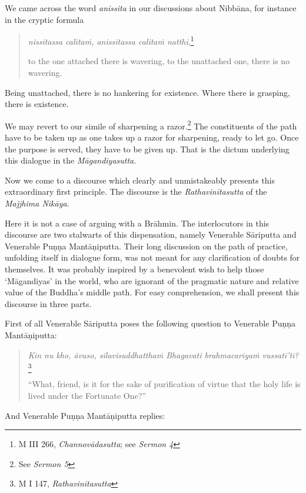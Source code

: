 We came across the word \emph{anissita} in our discussions about Nibbāna, for instance in the cryptic formula

\begin{quote}
\emph{nissitassa calitaṁ, anissitassa calitaṁ natthi},\footnote{M III 266, \emph{Channovādasutta}; see \emph{Sermon 4}}

to the one attached there is wavering, to the unattached one, there is no wavering.
\end{quote}

Being unattached, there is no hankering for existence. Where there is grasping, there is existence.

We may revert to our simile of sharpening a razor.\footnote{See \emph{Sermon 5}} The constituents of the path have to be taken up as one takes up a razor for sharpening, ready to let go. Once the purpose is served, they have to be given up. That is the dictum underlying this dialogue in the \emph{Māgandiyasutta}.

Now we come to a discourse which clearly and unmistakeably presents this extraordinary first principle. The discourse is the \emph{Rathavinītasutta} of the \emph{Majjhima Nikāya}.

Here it is not a case of arguing with a Brāhmin. The interlocutors in this discourse are two stalwarts of this dispensation, namely Venerable Sāriputta and Venerable Puṇṇa Mantāṇiputta. Their long discussion on the path of practice, unfolding itself in dialogue form, was not meant for any clarification of doubts for themselves. It was probably inspired by a benevolent wish to help those `Māgandiyas' in the world, who are ignorant of the pragmatic nature and relative value of the Buddha's middle path. For easy comprehension, we shall present this discourse in three parts.

First of all Venerable Sāriputta poses the following question to Venerable Puṇṇa Mantāṇiputta:

\begin{quote}
\emph{Kin nu kho, āvuso, sīlavisuddhatthaṁ Bhagavati brahmacariyaṁ vussatī'ti?}\footnote{M I 147, \emph{Rathavinītasutta}}

``What, friend, is it for the sake of purification of virtue that the holy life is lived under the Fortunate One?''
\end{quote}

And Venerable Puṇṇa Mantāṇiputta replies:

